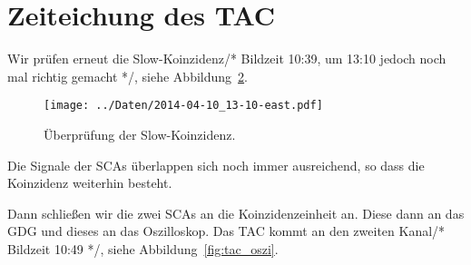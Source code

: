 \begin{figure}[htbp]
    \centering
    \caption{%
    }
    \label{fig:aufbau:fast3}
\end{figure}

\section{Zeiteichung des TAC}

Wir prüfen erneut die Slow-Koinzidenz/* Bildzeit 10:39, um 13:10 jedoch noch
mal richtig gemacht */, siehe Abbildung~\ref{fig:pruef_slow}.

\begin{figure}[htbp]
    \centering
    \texttt{[image: ../Daten/2014-04-10\_13-10-east.pdf]}
    \caption{%
        Überprüfung der Slow-Koinzidenz.
    }
    \label{fig:pruef_slow}
\end{figure}

Die Signale der SCAs überlappen sich noch immer ausreichend, so dass die
Koinzidenz weiterhin besteht.

Dann schließen wir die zwei SCAs an die Koinzidenzeinheit an. Diese dann an das
GDG und dieses an das Oszilloskop. Das TAC kommt an den zweiten Kanal/*
Bildzeit 10:49 */, siehe Abbildung~\ref{fig:tac_oszi}.

